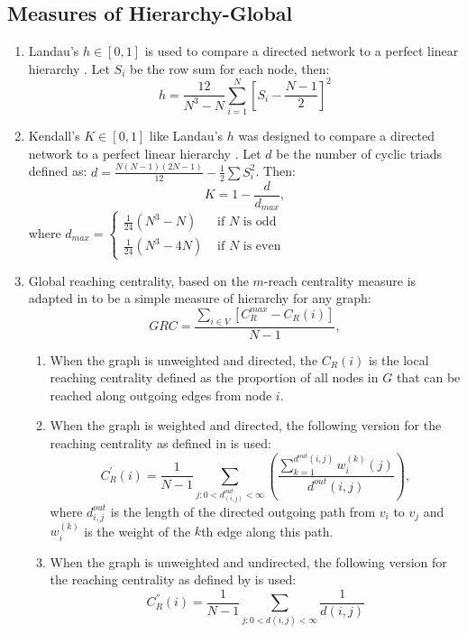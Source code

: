 \documentclass[3p,times]{elsarticle}
\begin{document}
\subsection{Measures of Hierarchy-Global}
\begin{enumerate}
	\item Landau's $h\in[0,1]$ is used to compare a directed network to a perfect linear hierarchy \cite{landau}. Let $S_i$ be the row sum for each node, then:
		$$
		h=\frac{12}{N^3-N}\sum_{i=1}^{N}{[S_i-\frac{N-1}{2}]^{2}}
		$$
	\item Kendall's $K\in[0,1]$ like Landau's $h$ was designed to compare a directed network to a perfect linear hierarchy \cite{kendall}. Let $d$ be the number of cyclic triads
		defined as: $d=\frac{N(N-1)(2N-1)}{12}-\frac{1}{2}\sum{S_i^2}$. Then: 
		$$
		K=1-\frac{d}{d_{max}},
		$$ 
		where $d_{max} = \left\{ \begin{array}{rl}
		\frac{1}{24}(N^3-N)&\mbox{ if $N$ is odd} \\
		\frac{1}{24}(N^3-4N)&\mbox{ if $N$ is even}
		\end{array} \right.$
	\item Global reaching centrality, based on the $m$-reach centrality measure is adapted in \cite{GRC} to be a simple measure of hierarchy for any graph:
		$$
		GRC=\frac{\sum_{i\in V}{[C_R^{max}-C_R(i)]}}{N-1},
		$$
		\begin{enumerate}
			\item When the graph is unweighted and directed, the $C_R(i)$ is the local reaching centrality defined as the proportion of all nodes in $G$ that can be reached along 
				outgoing edges from node $i$.
			\item When the graph is weighted and directed, the following version for the reaching centrality as defined in \cite{GRC} is used:
				$$
				C_{R}^{'}(i)=\frac{1}{N-1}\sum_{j: 0<d^{out}_{(i,j)}<\infty}{( \frac{\sum_{k=1}^{d^{out}(i,j)} {w_{i}^{(k)} (j) } }{d^{out}(i,j)} )},
				$$
				where $d^{out}_{i,j}$ is the length of the directed outgoing path from $v_{i}$ to $v_{j}$ and $w^{(k)}_{i}$ is the weight of the $k$th edge along this path. 
			\item When the graph is unweighted and undirected, the following version for the reaching centrality as defined by \cite{GRC} is used:
				$$
				C_{R}^{''}(i)=\frac{1}{N-1}\sum_{j:0<d(i,j)<\infty}{\frac{1}{d(i,j)}}
				$$
		\end{enumerate}
	

\end{enumerate}
\end{document}
